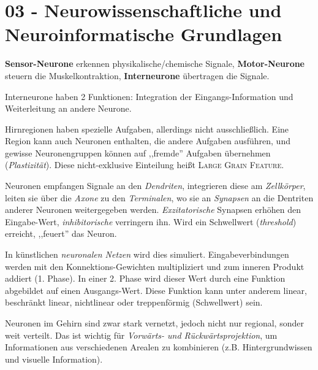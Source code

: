 \section{03 - Neurowissenschaftliche und Neuroinformatische Grundlagen}

\textbf{Sensor-Neurone} erkennen physikalische/chemische Signale, \textbf{Motor-Neurone}
steuern die Muskelkontraktion, \textbf{Interneurone} übertragen die Signale.

Interneurone haben 2 Funktionen: Integration der Eingangs-Information und Weiterleitung
an andere Neurone.

Hirnregionen haben spezielle Aufgaben, allerdings nicht ausschließlich. Eine Region kann
auch Neuronen enthalten, die andere Aufgaben ausführen, und gewisse Neuronengruppen können
auf ,,fremde'' Aufgaben übernehmen (\emph{Plastizität}). Diese nicht-exklusive Einteilung
heißt \textsc{Large Grain Feature}.

Neuronen empfangen Signale an den \emph{Dendriten}, integrieren diese am \emph{Zellkörper}, leiten
sie über die \emph{Axone} zu den \emph{Terminalen}, wo sie an \emph{Synapsen} an die Dentriten anderer
Neuronen weitergegeben werden. \emph{Exzitatorische} Synapsen erhöhen den Eingabe-Wert,
\emph{inhibitorische} verringern ihn. Wird ein Schwellwert (\emph{threshold}) erreicht, ,,feuert'' das Neuron.

In künstlichen \emph{neuronalen Netzen} wird dies simuliert. Eingabeverbindungen werden
mit den Konnektions-Gewichten multipliziert und zum inneren Produkt addiert (1. Phase). In einer 2. Phase
wird dieser Wert durch eine Funktion abgebildet auf einen Ausgangs-Wert. Diese Funktion
kann unter anderem linear, beschränkt linear, nichtlinear oder treppenförmig (Schwellwert) sein.

Neuronen im Gehirn sind zwar stark vernetzt, jedoch nicht nur regional, sonder weit
verteilt. Das ist wichtig für \emph{Vorwärts- und Rückwärtsprojektion}, um Informationen
aus verschiedenen Arealen zu kombinieren (z.B. Hintergrundwissen und visuelle Information).
